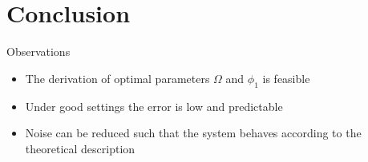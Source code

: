 \documentclass[aspectratio=1610, 9pt]{beamer}
\begin{document}
\section{Conclusion}
\label{sec:Conclusion}

\begin{frame}{Observations}
  \begin{itemize}
    \item The derivation of optimal parameters $\Omega$ and $\phi_1$ is feasible
    \item Under good settings the error is low and predictable
    \item Noise can be reduced such that the system behaves according to the theoretical
      description
  \end{itemize}
\end{frame}
\end{document}
